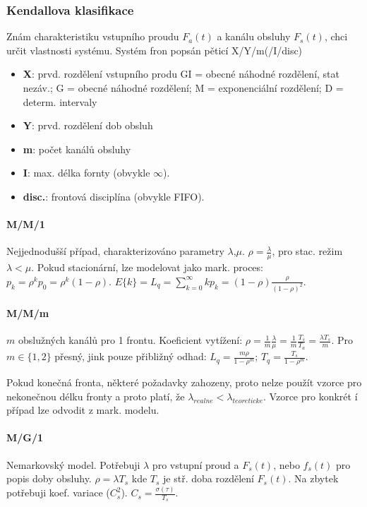 \documentclass[11pt,a4paper]{scrartcl}
\begin{document}
	\subsubsection{Kendallova klasifikace}
	Znám charakteristiku vstupního proudu $F_a(t)$ a kanálu obsluhy $F_s(t)$, chci určit vlastnosti systému. Systém fron popsán pěticí X/Y/m(/I/disc)
	\begin{itemize}
		\item \textbf{X}: prvd. rozdělení vstupního produ
			\subitem GI = obecné náhodné rozdělení, stat nezáv.; G = obecné náhodné rozdělení; M = exponenciální rozdělení; D = determ. intervaly
		\item \textbf{Y}: prvd. rozdělení dob obsluh
		\item \textbf{m}: počet kanálů obsluhy
		\item \textbf{I}: max. délka fornty (obvykle $\infty$).
		\item \textbf{disc.}: frontová disciplína (obvykle FIFO).
	\end{itemize}
	 
	\paragraph{M/M/1}
	Nejjednodušší případ, charakterizováno parametry $\lambda$,$\mu$. $\rho = \frac{\lambda}{\mu}$, pro stac. režim $\lambda < \mu$. Pokud stacionární, lze modelovat jako mark. proces: $p_k=\rho^kp_0=\rho^k(1-\rho)$. $E\{k\} = L_q = \sum_{k=0}^{\infty} kp_k = (1-\rho)\frac{\rho}{(1-\rho)^2}$.
	
	\paragraph{M/M/m}
	$m$ obslužných kanálů pro 1 frontu.
	Koeficient vytížení: $\rho=\frac{1}{m}\frac{\lambda}{\mu}=\frac{1}{m}\frac{T_s}{T_a}=\frac{\lambda T_s}{m}$. Pro $m\in\{1,2\}$ přesný, jink pouze přibližný odhad: $L_q=\frac{m\rho}{1-\rho^m}$; $T_q=\frac{T_s}{1-\rho^m}$.
	
	Pokud konečná fronta, některé požadavky zahozeny, proto nelze použít vzorce pro nekonečnou délku fronty a proto platí, že $\lambda_{realne} < \lambda_{teoreticke}$. Vzorce pro konkrét í případ lze odvodit z mark. modelu.
	
	\paragraph{M/G/1}
	Nemarkovský model. Potřebuji $\lambda$ pro vstupní proud a $F_s(t)$, nebo $f_s(t)$ pro popis doby obsluhy. $\rho = \lambda T_s$ kde $T_s$ je stř. doba rozdělení $F_s(t)$. Na zbytek potřebuji koef. variace ($C_s^2$). $C_s = \frac{\sigma(\tau)}{T_s}$.
	
\end{document}
